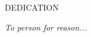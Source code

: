 \newpage
\thispagestyle{empty}

\begin{center}
  DEDICATION\\
\end{center}

\noindent \textit{To person for reason...}
